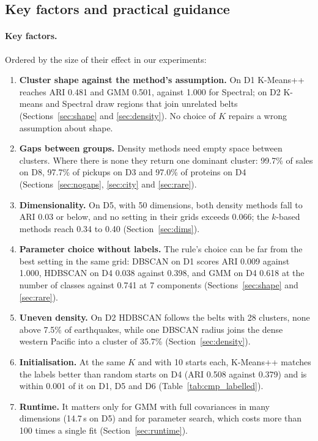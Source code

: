 \subsection{Key factors and practical guidance}\label{sec:factors}


\paragraph{Key factors.} Ordered by the size of their effect in our experiments:
\begin{enumerate}\itemsep1pt
\item \textbf{Cluster shape against the method's assumption.} On D1 K-Means++ reaches ARI 0.481 and GMM
0.501, against 1.000 for Spectral; on D2 K-means and Spectral draw regions that join unrelated belts
(Sections~\ref{sec:shape} and \ref{sec:density}). No choice of $K$ repairs a wrong assumption about shape.
\item \textbf{Gaps between groups.} Density methods need empty space between clusters. Where there is
none they return one dominant cluster: 99.7\% of sales on D8, 97.7\% of pickups on D3 and 97.0\% of
proteins on D4 (Sections~\ref{sec:nogaps}, \ref{sec:city} and \ref{sec:rare}).
\item \textbf{Dimensionality.} On D5, with 50 dimensions, both density methods fall to ARI 0.03 or below,
and no setting in their grids exceeds 0.066; the $k$-based methods reach 0.34 to 0.40
(Section~\ref{sec:dims}).
\item \textbf{Parameter choice without labels.} The rule's choice can be far from the best setting in the
same grid: DBSCAN on D1 scores ARI 0.009 against 1.000, HDBSCAN on D4 0.038 against 0.398, and GMM on D4
0.618 at the number of classes against 0.741 at 7 components (Sections~\ref{sec:shape} and \ref{sec:rare}).
\item \textbf{Uneven density.} On D2 HDBSCAN follows the belts with 28 clusters, none above 7.5\% of
earthquakes, while one DBSCAN radius joins the dense western Pacific into a cluster of 35.7\%
(Section~\ref{sec:density}).
\item \textbf{Initialisation.} At the same $K$ and with 10 starts each, K-Means++ matches the labels better
than random starts on D4 (ARI 0.508 against 0.379) and is within 0.001 of it on D1, D5 and D6
(Table~\ref{tab:cmp_labelled}).
\item \textbf{Runtime.} It matters only for GMM with full covariances in many dimensions (14.7\,s on D5)
and for parameter search, which costs more than 100 times a single fit (Section~\ref{sec:runtime}).
\end{enumerate}
